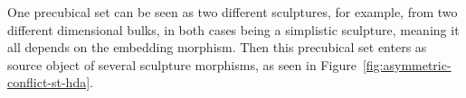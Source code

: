 

    \begin{remark}
        One precubical set can be seen as two different sculptures, for example, from two different dimensional bulks, in both cases being a simplistic sculpture, meaning it all depends on the embedding morphism. Then this precubical set enters as source object of several sculpture morphisms, as seen in Figure~\ref{fig:asymmetric-conflict-st-hda}.
        


    \end{remark}

    
    
